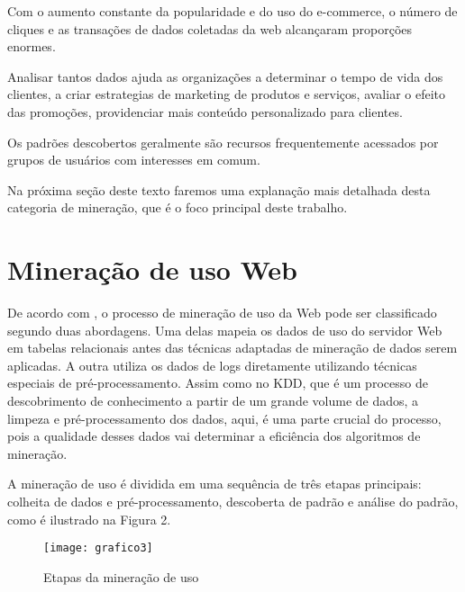 	Com o aumento constante da popularidade e do uso do e-commerce, o número de cliques e as transações de dados coletadas da web alcançaram proporções enormes.

	Analisar tantos dados ajuda as organizações a determinar o tempo de vida dos clientes, a criar estrategias de marketing de produtos e serviços, avaliar o efeito das promoções, providenciar mais conteúdo personalizado para clientes.

	Os padrões descobertos geralmente são recursos frequentemente acessados por grupos de usuários com interesses em comum.

	Na próxima seção deste texto faremos uma explanação mais detalhada desta categoria de mineração, que é o foco principal deste trabalho.

\section{Mineração de uso Web}
    De acordo com \cite{Girardi}, o processo de mineração de uso da Web pode ser classificado segundo duas abordagens. Uma delas mapeia os dados de uso do servidor Web em tabelas relacionais antes das técnicas adaptadas de mineração de dados serem aplicadas. A outra utiliza os dados de logs diretamente utilizando técnicas especiais de pré-processamento. Assim como no KDD, que é um processo de descobrimento de conhecimento a partir de um grande volume de dados, a limpeza e pré-processamento dos dados, aqui, é uma parte crucial do processo, pois a qualidade desses dados vai determinar a eficiência dos algoritmos de mineração.

	A mineração de uso é dividida em uma sequência de três etapas principais: colheita de dados e pré-processamento, descoberta de padrão e análise do padrão, como é ilustrado na Figura 2.

\begin{figure}[!htb]
\centering
\texttt{[image: grafico3]}
\caption{Etapas da mineração de uso}
\label{Rotulo}
\end{figure}

